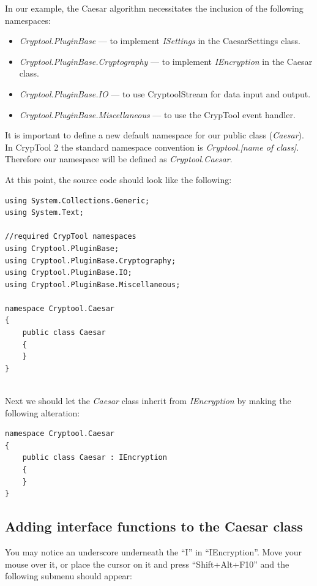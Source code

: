 \noindent In our example, the Caesar algorithm necessitates the inclusion of the following namespaces:

\begin{itemize}
	\item \textit{Cryptool.PluginBase} --- to implement \textit{ISettings} in the CaesarSettings class.
	\item \textit{Cryptool.PluginBase.Cryptography} --- to implement \textit{IEncryption} in the Caesar class.
	\item \textit{Cryptool.PluginBase.IO} --- to use CryptoolStream for data input and output.
	\item \textit{Cryptool.PluginBase.Miscellaneous} --- to use the CrypTool event handler.
\end{itemize}

\noindent It is important to define a new default namespace for our public class (\textit{Caesar}). In CrypTool 2  the standard namespace convention is \textit{Cryptool.[name of class]}. Therefore our namespace will be defined as \textit{Cryptool.Caesar}.\clearpage

\noindent At this point, the source code should look like the following:

\begin{lstlisting}
using System.Collections.Generic;
using System.Text;

//required CrypTool namespaces
using Cryptool.PluginBase;
using Cryptool.PluginBase.Cryptography;
using Cryptool.PluginBase.IO;
using Cryptool.PluginBase.Miscellaneous;

namespace Cryptool.Caesar
{
	public class Caesar
	{
	}
}
\end{lstlisting}

\ \\ %
\noindent Next we should let the \textit{Caesar} class inherit from \textit{IEncryption} by making the following alteration:

\begin{lstlisting}
namespace Cryptool.Caesar
{
	public class Caesar : IEncryption
	{
	}
}
\end{lstlisting}

\subsection{Adding interface functions to the Caesar class}
\label{sec:AddingInterfaceFunctionsToTheCaesarClass}

You may notice an underscore underneath the ``I'' in ``IEncryption''. Move your mouse over it, or place the cursor on it and press ``Shift+Alt+F10'' and the following submenu should appear:

